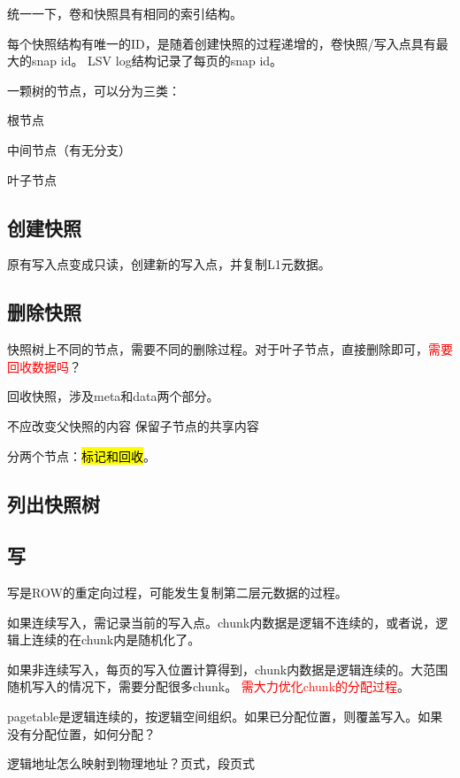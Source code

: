 统一一下，卷和快照具有相同的索引结构。

每个快照结构有唯一的ID，是随着创建快照的过程递增的，卷快照/写入点具有最大的snap id。
LSV log结构记录了每页的snap id。

一颗树的节点，可以分为三类：
\begin{compactenum}
\item 根节点
\item 中间节点（有无分支）
\item 叶子节点
\end{compactenum}

\subsection{创建快照}

原有写入点变成只读，创建新的写入点，并复制L1元数据。

\subsection{删除快照}

快照树上不同的节点，需要不同的删除过程。对于叶子节点，直接删除即可，\textcolor{red}{需要回收数据吗}？

回收快照，涉及meta和data两个部分。

不应改变父快照的内容
保留子节点的共享内容

分两个节点：\hl{标记和回收}。

\subsection{列出快照树}

\subsection{写}

写是ROW的重定向过程，可能发生复制第二层元数据的过程。

如果连续写入，需记录当前的写入点。chunk内数据是逻辑不连续的，或者说，逻辑上连续的在chunk内是随机化了。

如果非连续写入，每页的写入位置计算得到，chunk内数据是逻辑连续的。大范围随机写入的情况下，需要分配很多chunk。
\textcolor{red}{需大力优化chunk的分配过程}。

pagetable是逻辑连续的，按逻辑空间组织。如果已分配位置，则覆盖写入。如果没有分配位置，如何分配？

逻辑地址怎么映射到物理地址？页式，段页式

